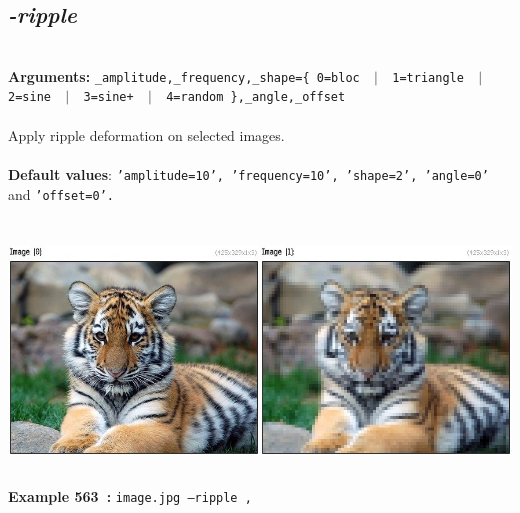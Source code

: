 \documentclass[a4paper,11pt,twoside]{book}
\begin{document}
\subsection{\emph{-ripple} }\vspace*{-0.5em}
~\\\textbf{Arguments: } 
{\small \texttt{\_amplitude,\_frequency,\_shape=\{ 0=bloc ~$|$~ 1=triangle ~$|$~ 2=sine ~$|$~ 3=sine+ ~$|$~ 4=random \},\_angle,\_offset}}\\~\\
Apply ripple deformation on selected images.
~\\~\\\textbf{Default values}: {\small \texttt{'amplitude=10', 'frequency=10', 'shape=2', 'angle=0'} and \texttt{'offset=0'.}}
\begin{center}\includegraphics[keepaspectratio=true,height=7cm,width=\textwidth]{img/gmic_def563.jpg}\\
{\footnotesize \textbf{Example 563~:} \texttt{image.jpg --ripple ,}}
\end{center}
\end{document}
